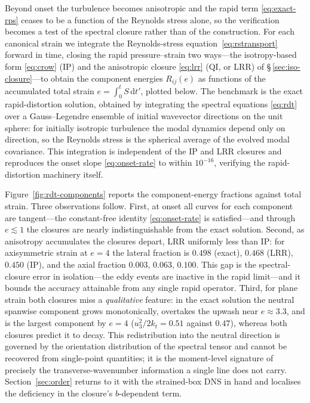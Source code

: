 \documentclass[lineno]{JFM-FLM_Au}
\begin{document}
Beyond onset the turbulence becomes anisotropic and the rapid term
\eqref{eq:exact-rps} ceases to be a function of the Reynolds stress
alone, so the verification becomes a test of the spectral closure rather
than of the construction. For each canonical strain we integrate the
Reynolds-stress equation~\eqref{eq:rstransport} forward in time, closing
the rapid pressure--strain two ways---the isotropy-based form
\eqref{eq:crow} (IP) and the anisotropic closure \eqref{eq:lrr} (QI, or
LRR) of \S\,\ref{sec:iso-closure}---to obtain the component energies
$R_{ij}(e)$ as functions of the accumulated total strain
$e=\int_0^{t}S\,\mathrm{d}t'$, plotted below. The benchmark is the exact rapid-distortion
solution, obtained by integrating the spectral equations \eqref{eq:rdt}
over a Gauss--Legendre ensemble of initial wavevector directions on the
unit sphere: for initially isotropic turbulence the modal dynamics depend
only on direction, so the Reynolds stress is the spherical average of the
evolved modal covariance. This integration is independent of the IP and
LRR closures and reproduces the onset slope \eqref{eq:onset-rate} to within
$10^{-16}$, verifying the rapid-distortion machinery itself.

Figure~\ref{fig:rdt-components} reports the component-energy fractions
against total strain. Three observations follow. First, at onset all
curves for each component are tangent---the constant-free identity
\eqref{eq:onset-rate} is satisfied---and through $e\lesssim1$ the
closures are nearly indistinguishable from the exact solution. Second,
as anisotropy accumulates the closures depart, LRR uniformly less than
IP: for axisymmetric strain at $e=4$ the lateral fraction is $0.498$
(exact), $0.468$ (LRR), $0.450$ (IP), and the axial fraction $0.003$,
$0.063$, $0.100$. This gap is the spectral-closure error in
isolation---the eddy events are inactive in the rapid limit---and it
bounds the accuracy attainable from any single rapid operator. Third, for plane strain both closures miss
a \emph{qualitative} feature: in the exact solution the neutral spanwise
component grows monotonically, overtakes the upwash near $e\approx3.3$,
and is the largest component by $e=4$
($\overline{u_3^2}/2k_t=0.51$ against $0.47$), whereas both closures
predict it to decay. This redistribution into the neutral direction is
governed by the orientation distribution of the spectral tensor and
cannot be recovered from single-point quantities; it is the moment-level
signature of precisely the transverse-wavenumber information a single
line does not carry. Section~\ref{sec:order} returns to it with the
strained-box DNS in hand and localises the deficiency in the closure's
$b$-dependent term.
\end{document}
